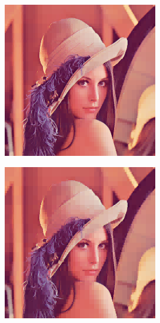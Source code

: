 \begin{figure}
  \centering
  \begin{subfigure}[b]{0.24\textwidth}
    \centering
    \includegraphics[width=\textwidth]{plaatjes/Lenna_haar_0_1.png}
  \end{subfigure}
  \begin{subfigure}[b]{0.24\textwidth}
    \centering
    \includegraphics[width=\textwidth]{plaatjes/Lenna_haar_0_05.png}

\end{subfigure}
\end{figure}
